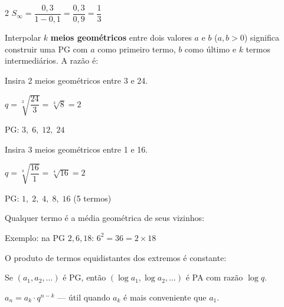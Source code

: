 \documentclass[12pt]{article}
\begin{document}
\begin{multicols}{2}
$S_\infty = \dfrac{0{,}3}{1 - 0{,}1} = \dfrac{0{,}3}{0{,}9} = \boxed{\dfrac{1}{3}}$


Interpolar $k$ \textbf{meios geométricos} entre dois valores $a$ e $b$
($a, b > 0$) significa construir uma PG com $a$ como primeiro termo, $b$ como
último e $k$ termos intermediários. A razão é:



Insira 2 meios geométricos entre 3 e 24.

$q = \sqrt[3]{\dfrac{24}{3}} = \sqrt[3]{8} = 2$

PG: $\boxed{3,\; 6,\; 12,\; 24}$


Insira 3 meios geométricos entre 1 e 16.

$q = \sqrt[4]{\dfrac{16}{1}} = \sqrt[4]{16} = 2$

PG: $\boxed{1,\; 2,\; 4,\; 8,\; 16}$ \quad (5 termos)



Qualquer termo é a média geométrica de seus vizinhos:


Exemplo: na PG $2, 6, 18$: $6^2 = 36 = 2 \times 18$ \checkmark


O produto de termos equidistantes dos extremos é constante:



Se $(a_1, a_2, \ldots)$ é PG, então $(\log a_1, \log a_2, \ldots)$ é PA com razão $\log q$.


$a_n = a_k \cdot q^{n-k}$ — útil quando $a_k$ é mais conveniente que $a_1$.




\end{multicols}
\end{document}
